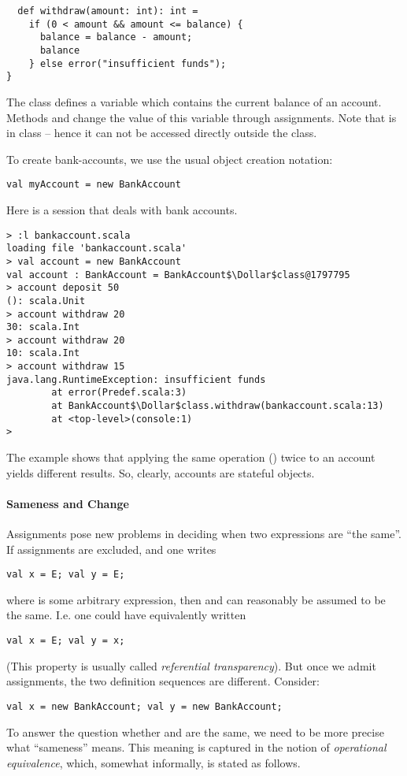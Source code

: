 \documentclass[a4paper,12pt,twoside,titlepage]{book}
\begin{document}
{\begin{lstlisting}
  def withdraw(amount: int): int =
    if (0 < amount && amount <= balance) {
      balance = balance - amount;
      balance
    } else error("insufficient funds");
}
\end{lstlisting}
The class defines a variable  which contains the current
balance of an account. Methods  and 
change the value of this variable through assignments.  Note that
 is  in class  -- hence
it can not be accessed directly outside the class.

To create bank-accounts, we use the usual object creation notation:
\begin{lstlisting}
val myAccount = new BankAccount
\end{lstlisting}

\example Here is a  session that deals with bank
accounts.

\begin{lstlisting}
> :l bankaccount.scala
loading file 'bankaccount.scala'
> val account = new BankAccount
val account : BankAccount = BankAccount$\Dollar$class@1797795
> account deposit 50
(): scala.Unit
> account withdraw 20
30: scala.Int
> account withdraw 20
10: scala.Int
> account withdraw 15
java.lang.RuntimeException: insufficient funds
        at error(Predef.scala:3)
        at BankAccount$\Dollar$class.withdraw(bankaccount.scala:13)
        at <top-level>(console:1)
> 
\end{lstlisting}
The example shows that applying the same operation () twice to an account yields different results. So, clearly,
accounts are stateful objects.  

\paragraph{Sameness and Change}
Assignments pose new problems in deciding when two expressions are
``the same''.
If assignments are excluded, and one writes
\begin{lstlisting}
val x = E; val y = E;
\end{lstlisting}
where  is some arbitrary expression,
then  and  can reasonably be assumed to be the same.
I.e. one could have equivalently written
\begin{lstlisting}
val x = E; val y = x;
\end{lstlisting}
(This property is usually called {\em referential transparency}). But
once we admit assignments, the two definition sequences are different.
Consider:
\begin{lstlisting}
val x = new BankAccount; val y = new BankAccount;
\end{lstlisting}
To answer the question whether  and  are the same, we
need to be more precise what ``sameness'' means. This meaning is
captured in the notion of {\em operational equivalence}, which,
somewhat informally, is stated as follows.

}
\end{document}
